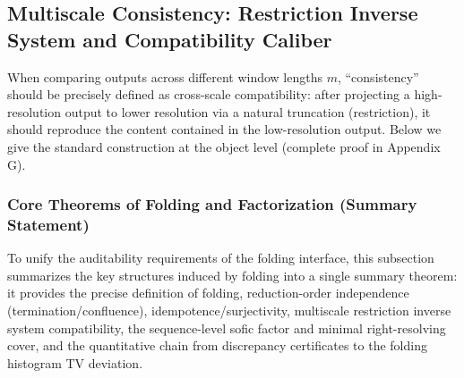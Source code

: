 \subsection{Multiscale Consistency: Restriction Inverse System and Compatibility Caliber}\label{subsec:folding-multiscale}

When comparing outputs across different window lengths $m$, ``consistency'' should be precisely defined as cross-scale compatibility: after projecting a high-resolution output to lower resolution via a natural truncation (restriction), it should reproduce the content contained in the low-resolution output. Below we give the standard construction at the object level (complete proof in Appendix G).

\subsubsection{Core Theorems of Folding and Factorization (Summary Statement)}\label{subsec:fold-theorem-suite}
To unify the auditability requirements of the folding interface, this subsection summarizes the key structures induced by folding into a single summary theorem: it provides the precise definition of folding, reduction-order independence (termination/confluence), idempotence/surjectivity, multiscale restriction inverse system compatibility, the sequence-level sofic factor and minimal right-resolving cover, and the quantitative chain from discrepancy certificates to the folding histogram TV deviation.

